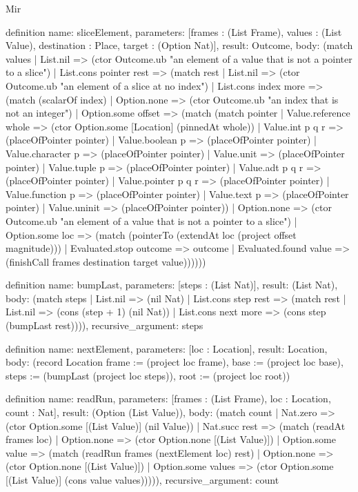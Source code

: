 \begin{lexlean}{Mir}
\begin{semanticmodule}
definition{
  name: sliceElement,
  parameters: [frames : (List Frame), values : (List Value), destination : Place, target : (Option Nat)],
  result: Outcome,
  body: (match values
    | List.nil => (ctor Outcome.ub "an element of a value that is not a pointer to a slice")
    | List.cons pointer rest => (match rest
      | List.nil => (ctor Outcome.ub "an element of a slice at no index")
      | List.cons index more => (match (scalarOf index)
        | Option.none => (ctor Outcome.ub "an index that is not an integer")
        | Option.some offset => (match (match pointer
            | Value.reference whole => (ctor Option.some [Location] (pinnedAt whole))
            | Value.int p q r => (placeOfPointer pointer)
            | Value.boolean p => (placeOfPointer pointer)
            | Value.character p => (placeOfPointer pointer)
            | Value.unit => (placeOfPointer pointer)
            | Value.tuple p => (placeOfPointer pointer)
            | Value.adt p q r => (placeOfPointer pointer)
            | Value.pointer p q r => (placeOfPointer pointer)
            | Value.function p => (placeOfPointer pointer)
            | Value.text p => (placeOfPointer pointer)
            | Value.uninit => (placeOfPointer pointer))
          | Option.none => (ctor Outcome.ub "an element of a value that is not a pointer to a slice")
          | Option.some loc => (match (pointerTo (extendAt loc (project offset magnitude)))
            | Evaluated.stop outcome => outcome
            | Evaluated.found value => (finishCall frames destination target value))))))
}

definition{
  name: bumpLast,
  parameters: [steps : (List Nat)],
  result: (List Nat),
  body: (match steps
    | List.nil => (nil Nat)
    | List.cons step rest => (match rest
      | List.nil => (cons (step + 1) (nil Nat))
      | List.cons next more => (cons step (bumpLast rest)))),
  recursive_argument: steps
}

definition{
  name: nextElement,
  parameters: [loc : Location],
  result: Location,
  body: (record Location {frame := (project loc frame), base := (project loc base), steps := (bumpLast (project loc steps)), root := (project loc root)})
}

definition{
  name: readRun,
  parameters: [frames : (List Frame), loc : Location, count : Nat],
  result: (Option (List Value)),
  body: (match count
    | Nat.zero => (ctor Option.some [(List Value)] (nil Value))
    | Nat.succ rest => (match (readAt frames loc)
      | Option.none => (ctor Option.none [(List Value)])
      | Option.some value => (match (readRun frames (nextElement loc) rest)
        | Option.none => (ctor Option.none [(List Value)])
        | Option.some values => (ctor Option.some [(List Value)] (cons value values))))),
  recursive_argument: count
}


\end{semanticmodule}
\end{lexlean}
